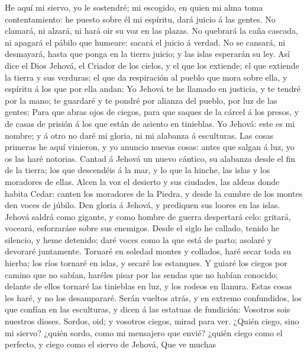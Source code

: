  He aquí mi siervo, yo le sostendré; mi escogido, en quien
mi alma toma contentamiento: he puesto sobre él mi espíritu, dará juicio
á las gentes.  No clamará, ni alzará, ni hará oir su voz en
las plazas.  No quebrará la caña cascada, ni apagará el
pábilo que humeare: sacará el juicio á verdad.  No se
cansará, ni desmayará, hasta que ponga en la tierra juicio; y las islas
esperarán su ley.  Así dice el Dios Jehová, el Criador de
los cielos, y el que los extiende; el que extiende la tierra y sus
verduras; el que da respiración al pueblo que mora sobre ella, y
espíritu á los que por ella andan:  Yo Jehová te he llamado
en justicia, y te tendré por la mano; te guardaré y te pondré por
alianza del pueblo, por luz de las gentes;  Para que abras
ojos de ciegos, para que saques de la cárcel á los presos, y de casas de
prisión á los que están de asiento en tinieblas.  Yo Jehová:
este es mi nombre; y á otro no daré mi gloria, ni mi alabanza á
esculturas.  Las cosas primeras he aquí vinieron, y yo
anuncio nuevas cosas: antes que salgan á luz, yo os las haré notorias.
 Cantad á Jehová un nuevo cántico, su alabanza desde el fin
de la tierra; los que descendéis á la mar, y lo que la hinche, las islas
y los moradores de ellas.  Alcen la voz el desierto y sus
ciudades, las aldeas donde habita Cedar: canten los moradores de la
Piedra, y desde la cumbre de los montes den voces de júbilo.
 Den gloria á Jehová, y prediquen sus loores en las islas.
 Jehová saldrá como gigante, y como hombre de guerra
despertará celo: gritará, voceará, esforzaráse sobre sus enemigos.
 Desde el siglo he callado, tenido he silencio, y heme
detenido: daré voces como la que está de parto; asolaré y devoraré
juntamente.  Tornaré en soledad montes y collados, haré
secar toda su hierba; los ríos tornaré en islas, y secaré los estanques.
 Y guiaré los ciegos por camino que no sabían, haréles
pisar por las sendas que no habían conocido; delante de ellos tornaré
las tinieblas en luz, y los rodeos en llanura. Estas cosas les haré, y
no los desampararé.  Serán vueltos atrás, y en extremo
confundidos, los que confían en las esculturas, y dicen á las estatuas
de fundición: Vosotros sois nuestros dioses.  Sordos, oid;
y vosotros ciegos, mirad para ver.  ¿Quién ciego, sino mi
siervo? ¿quién sordo, como mi mensajero que envié? ¿quién ciego como el
perfecto, y ciego como el siervo de Jehová,  Que ve muchas
